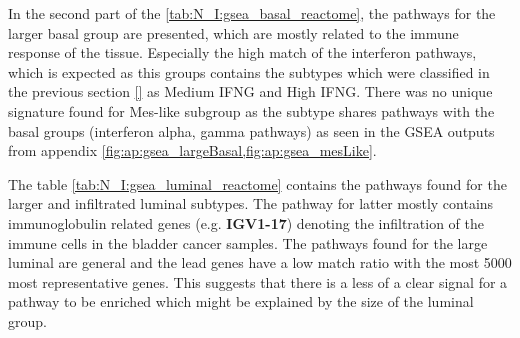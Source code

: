 In the second part of the \cref{tab:N_I:gsea_basal_reactome}, the pathways for the larger basal group are presented, which are mostly related to the immune response of the tissue. Especially the high match of the interferon pathways, which is expected as this groups contains the subtypes which were classified in the previous section \ref{} as Medium IFNG and High IFNG. There was no unique signature found for Mes-like subgroup as the subtype shares pathways with the basal groups (interferon alpha, gamma pathways) as seen in the GSEA outputs from appendix \cref{fig:ap:gsea_largeBasal,fig:ap:gsea_mesLike}.

The table \cref{tab:N_I:gsea_luminal_reactome} contains the pathways found for the larger and infiltrated luminal subtypes. The pathway for latter mostly contains immunoglobulin related genes (e.g. \textbf{IGV1-17}) denoting the infiltration of the immune cells in the bladder cancer samples. The pathways found for the large luminal are general and the lead genes have a low match ratio with the most 5000 most representative genes. This suggests that there is a less of a clear signal for a pathway to be enriched which might be explained by the size of the luminal group. 

